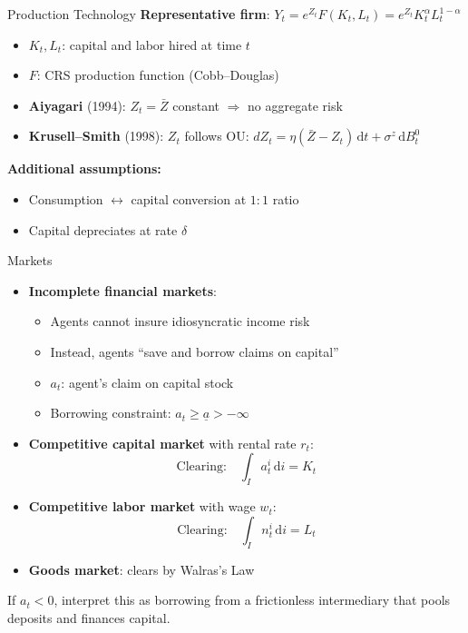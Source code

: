 \documentclass[aspectratio=169,11pt]{beamer}
\newcommand{\emphc}[1]{\textcolor{harvardcrimson}{#1}}
\newcommand{\ud}{\,\mathrm{d}}
\newcommand{\ubar}[1]{\underline{#1}}
\begin{document}
\begin{frame}{Production Technology}
\small
\textbf{Representative firm}: $Y_t = e^{Z_t} F(K_t, L_t) = e^{Z_t} K_t^\alpha L_t^{1-\alpha}$

\begin{itemize}\itemsep1pt
    \item $K_t, L_t$: capital and labor hired at time $t$
    \item $F$: CRS production function (Cobb--Douglas)
    \item \textbf{Aiyagari} (1994): $Z_t = \bar{Z}$ constant $\Rightarrow$ no aggregate risk
    \item \textbf{Krusell--Smith} (1998): $Z_t$ follows OU: $dZ_t = \eta(\bar{Z} - Z_t)\ud t + \sigma^z\ud B_t^0$
\end{itemize}

\vspace{0.1em}
\textbf{Additional assumptions:}
\begin{itemize}\itemsep1pt
    \item Consumption $\leftrightarrow$ capital conversion at $1:1$ ratio
    \item Capital depreciates at rate $\delta$
\end{itemize}
\end{frame}

\begin{frame}{Markets}
\small
\begin{itemize}\itemsep2pt
    \item \textbf{Incomplete financial markets}:
    \begin{itemize}\itemsep2pt
        \item Agents \emphc{cannot insure} idiosyncratic income risk
        \item Instead, agents ``save and borrow claims on capital''
        \item $a_t$: agent's claim on capital stock
        \item \emphc{Borrowing constraint}: $a_t \geq \ubar{a} > -\infty$
    \end{itemize}
    \item \textbf{Competitive capital market} with rental rate $r_t$:
    \[
    \text{Clearing:} \quad \int_I a_t^i \ud i = K_t
    \]
    \item \textbf{Competitive labor market} with wage $w_t$:
    \[
    \text{Clearing:} \quad \int_I n_t^i \ud i = L_t
    \]
    \item \textbf{Goods market}: clears by Walras's Law
\end{itemize}

\vspace{0.1em}
{\scriptsize If $a_t<0$, interpret this as borrowing from a frictionless intermediary that pools deposits and finances capital.}
\end{frame}
\end{document}
